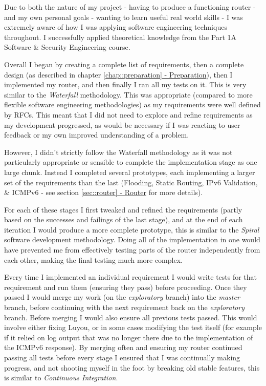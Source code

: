\documentclass[12pt,a4paper,twoside,openany]{report}
\begin{document}
Due to both the nature of my project - having to produce a functioning router - and my own personal goals - wanting to learn useful real world skills - I was extremely aware of how I was applying software engineering techniques throughout.  I successfully applied theoretical knowledge from the Part 1A Software \& Security Engineering course.

\bigskip

Overall I began by creating a complete list of requirements, then a complete design (as described in chapter \ref{chap::preparation}\hyperref[chap::preparation]{ - Preparation}), then I implemented my router, and then finally I ran all my tests on it.  This is very similar to the \textit{Waterfall} methodology.  This was appropriate (compared to more flexible software engineering methodologies) as my requirements were well defined by RFCs. This meant that I did not need to explore and refine requirements as my development progressed, as would be necessary if I was reacting to user feedback or my own improved understanding of a problem.

\bigskip

However, I didn't strictly follow the Waterfall methodology as it was not particularly appropriate or sensible to complete the implementation stage as one large chunk.  Instead I completed several prototypes, each implementing a larger set of the requirements than the last (Flooding, Static Routing, IPv6 Validation, \& ICMPv6 - see section \ref{sec::router}\hyperref[sec::router]{ - Router} for more details). 

For each of these stages I first tweaked and refined the requirements (partly based on the successes and failings of the last stage), and at the end of each iteration I would produce a more complete prototype, this is similar to the \textit{Spiral} software development methodology. Doing all of the implementation in one would have prevented me from effectively testing parts of the router independently from each other, making the final testing much more complex.

\bigskip

Every time I implemented an individual requirement I would write tests for that requirement and run them (ensuring they pass) before proceeding.  Once they passed I would merge my work (on the \textit{exploratory} branch) into the \textit{master} branch, before continuing with the next requirement back on the \textit{exploratory} branch.  Before merging I would also ensure all previous tests passed.  This would involve either fixing Luyou, or in some cases modifying the test itself (for example if it relied on log output that was no longer there due to the implementation of the ICMPv6 response).  By merging often and ensuring my router continued passing all tests before every stage I ensured that I was continually making progress, and not shooting myself in the foot by breaking old stable features, this is similar to \textit{Continuous Integration}.
\end{document}
